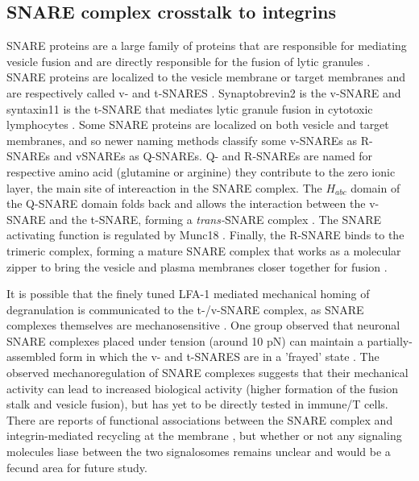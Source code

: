 \subsection{SNARE complex crosstalk to integrins}
SNARE proteins are a large family of proteins that are responsible for mediating vesicle fusion and are directly responsible for the fusion of lytic granules \cite{Chang2017}.  SNARE proteins are localized to the vesicle membrane or target membranes and are respectively called v- and t-SNARES \cite{Yoon2018}. Synaptobrevin2 is the v-SNARE and syntaxin11 is the t-SNARE that mediates lytic granule fusion in cytotoxic lymphocytes \cite{Halimani2014, Chitirala2019, Matti2013}.  Some SNARE proteins are localized on both vesicle and target membranes, and so newer naming methods classify some v-SNAREs as R-SNAREs and vSNAREs as Q-SNAREs. Q- and R-SNAREs are named for respective amino acid (glutamine or arginine) they contribute to the zero ionic layer, the main site of intereaction in the SNARE complex. The $H_{abc}$ domain of the Q-SNARE domain folds back and allows the interaction between the v-SNARE and the t-SNARE, forming a \textit{trans-}SNARE complex \cite{Yoon2018}.  The SNARE activating function is regulated by Munc18 \cite{Spessott2017, Yoon2018, Baker2015}. Finally, the R-SNARE binds to the trimeric complex, forming a mature SNARE complex that works as a molecular zipper to bring the vesicle and plasma membranes closer together for fusion \cite{Agostino2017}.

It is possible that the finely tuned LFA-1 mediated mechanical homing of degranulation is communicated to the t-/v-SNARE complex, as SNARE complexes themselves are mechanosensitive \cite{Risselada2020}. One group observed that neuronal SNARE complexes placed under tension (around 10 pN) can maintain a partially-assembled form in which the v- and t-SNARES are in a 'frayed' state \cite{Zhou2017}. The observed mechanoregulation of SNARE complexes suggests that their mechanical activity can lead to increased biological activity (higher formation of the fusion stalk and vesicle fusion), but has yet to be directly tested in immune/T cells. There are reports of functional associations between the SNARE complex and integrin-mediated recycling at the membrane \cite{Riggs2012, Zhuang2020, Nagy2009}, but whether or not any signaling molecules liase between the two signalosomes remains unclear and would be a fecund area for future study. 

